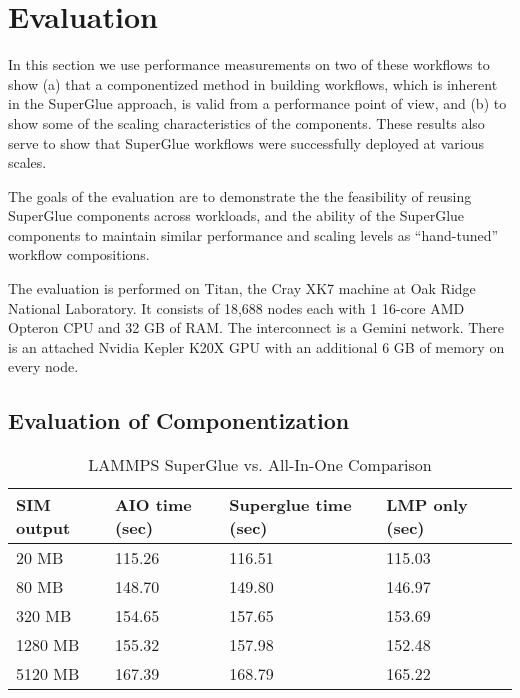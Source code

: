 \section{Evaluation}
\label{s:eval}

In this section we use
performance measurements on two of these workflows
to show (a) that a componentized method in
building workflows, which is inherent in the SuperGlue approach,
is valid from a performance point of view,
and (b) to show some of the scaling characteristics
of the components.
These results also serve to show that
SuperGlue workflows were successfully
deployed at various
scales.

The goals of the evaluation are to demonstrate the  the feasibility of reusing
  SuperGlue components across workloads, and the ability of the
  SuperGlue components to maintain similar performance and scaling
levels as ``hand-tuned'' workflow compositions. 
\fi

The evaluation is performed on Titan, the Cray XK7 machine at Oak Ridge
National Laboratory. It consists of 18,688 nodes each with 1 16-core AMD
Opteron CPU and 32 GB of RAM. The interconnect is a Gemini network. There is an
attached Nvidia Kepler K20X GPU with an additional 6 GB of memory on every
node.

\subsection{Evaluation of Componentization}

\begin{table}[tbp]
  \centering
  \caption{LAMMPS SuperGlue vs. All-In-One Comparison}
  \label{tab:aio}
  \begin{tabular}{|l|l|l|l|l|}
    \hline
    SIM output & AIO time (sec) & Superglue time (sec) & LMP only (sec) \\
    \hline
    20 MB & 115.26 & 116.51 & 115.03\\
    \hline
    80 MB & 148.70 & 149.80 & 146.97\\
    \hline
    320 MB & 154.65 & 157.65 & 153.69\\
    \hline
    1280 MB & 155.32 & 157.98 & 152.48\\
    \hline
    5120 MB & 167.39 & 168.79 & 165.22\\
    \hline
  \end{tabular}
\end{table}


